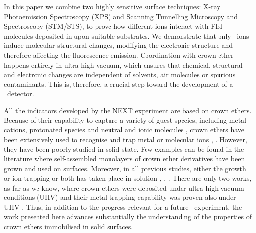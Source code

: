 \documentclass[aps,prl,reprint,longbibliography,superscriptaddress, english]{revtex4-1}
\begin{document}
In this paper we combine two highly sensitive surface techniques: X-ray Photoemission Spectroscopy (XPS) and Scanning Tunnelling Microscopy and Spectroscopy (STM/STS), to prove how different ions interact with FBI molecules deposited in upon suitable substrates. We demonstrate that only \Bapp\ ions induce molecular structural changes, modifying the electronic structure and therefore affecting the fluorescence emission. Coordination with crown-ether happens entirely in ultra-high vacuum, which ensures that chemical, structural and electronic changes are independent of solvents, air molecules or spurious contaminants. This is, therefore, a crucial step toward the development of a \Bapp\ detector. 

All the indicators developed by the NEXT experiment are based on crown ethers. Because of their capability to capture a variety of guest species, including metal cations, protonated species and neutral and ionic molecules \cite{dobler1981ionophores}, crown ethers \cite{gokel_crown_1991} have been extensively used to recognise and trap metal or molecular ions \cite{more_intrinsic_1999}, \cite{maleknia_cavity-size-dependent_2002}. However, they have been poorly studied in solid state. Few examples can be found in the literature where self-assembled monolayers of crown ether derivatives have been grown and used on surfaces. Moreover, in all previous studies, either the growth or ion trapping or both has taken place in solution \cite{yoshimoto_hostguest_2003}, \cite{flink_recognition_1999}, \cite{inokuchi_new_2015}. 
 There are only two works, as far as we know, where crown ethers were deposited under ultra high vacuum conditions (UHV) \cite{feng_growth_2018} and their metal trapping capability was proven also under UHV \cite{stredansky_-surface_2019}. Thus, in addition to the progress relevant for a future \bbonu\ experiment, the work presented here advances substantially the understanding of the properties of crown ethers immobilised in solid surfaces. 
 
 
\end{document}
